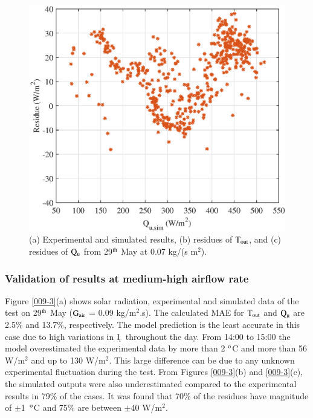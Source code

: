 \begin{figure}[ht!]
\begin{minipage}{0.39\columnwidth}
		\includegraphics[scale=0.5,width=1.0\columnwidth]{figs/007-residue-6.eps}
	\end{minipage}
	
	\caption{(a) Experimental and simulated results, (b) residues of $\rm{T_{out}}$, and (c) residues of $\rm{Q_{u}}$ from 29$^{\rm{th}}$ May at 0.07 kg/(s m$^2$).}
	\label{007-3}
\end{figure}


\subsubsection{Validation of results at medium-high airflow rate}

Figure \ref{009-3}(a) shows solar radiation, experimental and simulated data of the test on 29$^{\rm{th}}$ May ($\rm{G_{air}}$ = 0.09 kg/m$^2$.s). The calculated MAE for $\rm{T_{out}}$ and $\rm{Q_{u}}$ are 2.5\% and 13.7\%, respectively. The model prediction is the least accurate in this case due to high variations in $\rm{I_{\!_T}}$ throughout the day. From 14:00 to 15:00 the model overestimated the experimental data by more than 2 $^{\rm{o}}$C and more than 56 W/m$^2$ and up to 130 W/m$^2$. This large difference can be due to any unknown experimental fluctuation during the test. From Figures \ref{009-3}(b) and \ref{009-3}(c), the simulated outputs were also underestimated compared to the experimental results in 79\% of the cases. It was found that 70\% of the residues have magnitude of \mbox{$\pm$1 $^{\rm{o}}$C} and 75\% are between $\pm$40 W/m$^2$.

